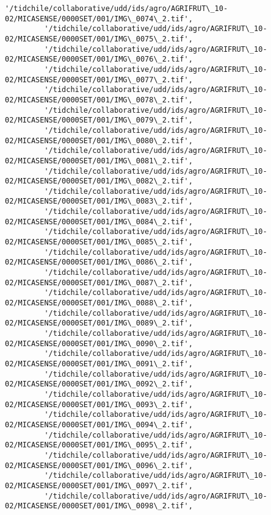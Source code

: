 \documentclass[11pt]{article}
\begin{document}
\begin{Verbatim}[commandchars=\\\{\}]
         '/tidchile/collaborative/udd/ids/agro/AGRIFRUT\_10-02/MICASENSE/0000SET/001/IMG\_0074\_2.tif',
         '/tidchile/collaborative/udd/ids/agro/AGRIFRUT\_10-02/MICASENSE/0000SET/001/IMG\_0075\_2.tif',
         '/tidchile/collaborative/udd/ids/agro/AGRIFRUT\_10-02/MICASENSE/0000SET/001/IMG\_0076\_2.tif',
         '/tidchile/collaborative/udd/ids/agro/AGRIFRUT\_10-02/MICASENSE/0000SET/001/IMG\_0077\_2.tif',
         '/tidchile/collaborative/udd/ids/agro/AGRIFRUT\_10-02/MICASENSE/0000SET/001/IMG\_0078\_2.tif',
         '/tidchile/collaborative/udd/ids/agro/AGRIFRUT\_10-02/MICASENSE/0000SET/001/IMG\_0079\_2.tif',
         '/tidchile/collaborative/udd/ids/agro/AGRIFRUT\_10-02/MICASENSE/0000SET/001/IMG\_0080\_2.tif',
         '/tidchile/collaborative/udd/ids/agro/AGRIFRUT\_10-02/MICASENSE/0000SET/001/IMG\_0081\_2.tif',
         '/tidchile/collaborative/udd/ids/agro/AGRIFRUT\_10-02/MICASENSE/0000SET/001/IMG\_0082\_2.tif',
         '/tidchile/collaborative/udd/ids/agro/AGRIFRUT\_10-02/MICASENSE/0000SET/001/IMG\_0083\_2.tif',
         '/tidchile/collaborative/udd/ids/agro/AGRIFRUT\_10-02/MICASENSE/0000SET/001/IMG\_0084\_2.tif',
         '/tidchile/collaborative/udd/ids/agro/AGRIFRUT\_10-02/MICASENSE/0000SET/001/IMG\_0085\_2.tif',
         '/tidchile/collaborative/udd/ids/agro/AGRIFRUT\_10-02/MICASENSE/0000SET/001/IMG\_0086\_2.tif',
         '/tidchile/collaborative/udd/ids/agro/AGRIFRUT\_10-02/MICASENSE/0000SET/001/IMG\_0087\_2.tif',
         '/tidchile/collaborative/udd/ids/agro/AGRIFRUT\_10-02/MICASENSE/0000SET/001/IMG\_0088\_2.tif',
         '/tidchile/collaborative/udd/ids/agro/AGRIFRUT\_10-02/MICASENSE/0000SET/001/IMG\_0089\_2.tif',
         '/tidchile/collaborative/udd/ids/agro/AGRIFRUT\_10-02/MICASENSE/0000SET/001/IMG\_0090\_2.tif',
         '/tidchile/collaborative/udd/ids/agro/AGRIFRUT\_10-02/MICASENSE/0000SET/001/IMG\_0091\_2.tif',
         '/tidchile/collaborative/udd/ids/agro/AGRIFRUT\_10-02/MICASENSE/0000SET/001/IMG\_0092\_2.tif',
         '/tidchile/collaborative/udd/ids/agro/AGRIFRUT\_10-02/MICASENSE/0000SET/001/IMG\_0093\_2.tif',
         '/tidchile/collaborative/udd/ids/agro/AGRIFRUT\_10-02/MICASENSE/0000SET/001/IMG\_0094\_2.tif',
         '/tidchile/collaborative/udd/ids/agro/AGRIFRUT\_10-02/MICASENSE/0000SET/001/IMG\_0095\_2.tif',
         '/tidchile/collaborative/udd/ids/agro/AGRIFRUT\_10-02/MICASENSE/0000SET/001/IMG\_0096\_2.tif',
         '/tidchile/collaborative/udd/ids/agro/AGRIFRUT\_10-02/MICASENSE/0000SET/001/IMG\_0097\_2.tif',
         '/tidchile/collaborative/udd/ids/agro/AGRIFRUT\_10-02/MICASENSE/0000SET/001/IMG\_0098\_2.tif',

\end{Verbatim}
\end{document}
